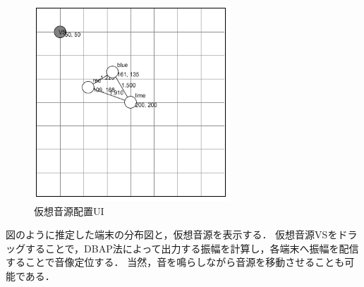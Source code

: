 \begin{figure}[tb]\centering
  \hspace{-2mm}\includegraphics[clip,width=1.1\hsize]{img/relpos.png}
  \caption{仮想音源配置UI}\label{fig:relpos}
\end{figure}

図のように推定した端末の分布図と，仮想音源を表示する．
仮想音源VSをドラッグすることで，DBAP法によって出力する振幅を計算し，各端末へ振幅を配信することで音像定位する．
当然，音を鳴らしながら音源を移動させることも可能である．

